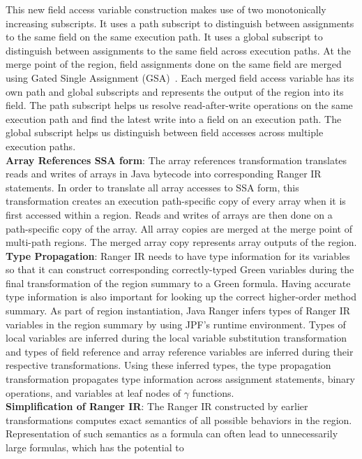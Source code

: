 %
This new field access variable construction makes use of two monotonically increasing subscripts.
%
It uses a path subscript to distinguish between assignments to the same field on the same execution path.
%
It uses a global subscript to distinguish between assignments to the same field across execution paths.
%
At the merge point of the region, field assignments done on the same field are merged using
Gated Single Assignment (GSA)~\cite{Ottenstein1990}.
%
Each merged field access variable has its own path and global subscripts and represents the output of the region into
its field.
%
The path subscript helps us resolve read-after-write operations on the same execution path and find the latest write
into a field on an execution path.
%
The global subscript helps us distinguish between field accesses across multiple execution paths. \\
\textbf{Array References SSA form}: The array references transformation translates reads and writes of arrays in
Java bytecode into corresponding Ranger IR statements.
%
In order to translate all array accesses to SSA form, this transformation creates an execution path-specific copy of
every array when it is first accessed within a region.
%
Reads and writes of arrays are then done on a path-specific copy of the array.
%
All array copies are merged at the merge point of multi-path regions.
%
The merged array copy represents array outputs of the region.\\
\textbf{Type Propagation}: Ranger IR needs to have type information for its variables so that it can construct
corresponding correctly-typed Green variables during the final transformation of the region summary to a Green formula.
%
Having accurate type information is also important for looking up the correct higher-order method summary.
%
As part of region instantiation, Java Ranger infers types of Ranger IR variables in the region summary by
using JPF's runtime environment.
%
Types of local variables are inferred during the local variable substitution transformation and types of field reference
and array reference variables are inferred during their respective transformations.
%
Using these inferred types, the type propagation transformation propagates type information across assignment
statements, binary operations, and variables at leaf nodes of $\gamma$ functions.\\
%
\textbf{Simplification of Ranger IR}: The Ranger IR constructed by earlier transformations computes exact semantics
of all possible behaviors in the region.
%
Representation of such semantics as a formula can often lead to unnecessarily large formulas, which has the potential to
